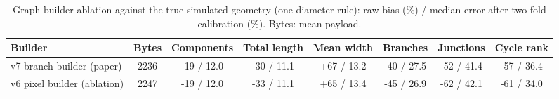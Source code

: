 \begin{table}[h]
\centering
\caption{Graph-builder ablation against the true simulated geometry (one-diameter rule): raw bias (\%) / median error after two-fold calibration (\%). Bytes: mean payload.}
\label{tab:supp-builder}
\footnotesize
\begin{adjustbox}{max width=\linewidth}
\begin{tabular}{lccccccc}
\toprule
Builder & Bytes & Components & Total length & Mean width & Branches & Junctions & Cycle rank\\
\midrule
v7 branch builder (paper) & 2236 & -19 / 12.0 & -30 / 11.1 & +67 / 13.2 & -40 / 27.5 & -52 / 41.4 & -57 / 36.4\\
v6 pixel builder (ablation) & 2247 & -19 / 12.0 & -33 / 11.1 & +65 / 13.4 & -45 / 26.9 & -62 / 42.1 & -61 / 34.0\\
\bottomrule
\end{tabular}
\end{adjustbox}
\end{table}
